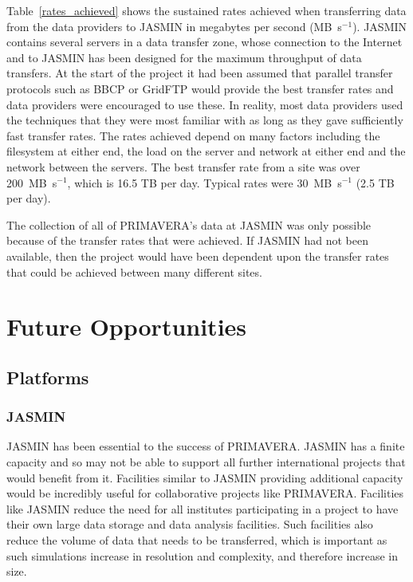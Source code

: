 \documentclass[gmd, manuscript]{copernicus}
\begin{document}
Table~\ref{rates_achieved} shows the sustained rates achieved when transferring data from the data providers to JASMIN in megabytes per second (MB~s$^{-1}$). JASMIN contains several servers in a data transfer zone, whose connection to the Internet and to JASMIN has been designed for the maximum throughput of data transfers. At the start of the project it had been assumed that parallel transfer protocols such as BBCP or GridFTP would provide the best transfer rates and data providers were encouraged to use these. In reality, most data providers used the techniques that they were most familiar with as long as they gave sufficiently fast transfer rates. The rates achieved depend on many factors including the filesystem at either end, the load on the server and network at either end and the network between the servers. The best transfer rate from a site was over 200~MB~s$^{-1}$, which is 16.5 TB per day. Typical rates were 30~MB~s$^{-1}$ (2.5 TB per day).

The collection of all of PRIMAVERA's data at JASMIN was only possible because of the transfer rates that were achieved. If JASMIN had not been available, then the project would have been dependent upon the transfer rates that could be achieved between many different sites.


\section{Future Opportunities}

\subsection{Platforms}

\subsubsection{JASMIN}
JASMIN has been essential to the success of PRIMAVERA. JASMIN has a finite capacity and so may not be able to support all further international projects that would benefit from it. Facilities similar to JASMIN providing additional capacity would be incredibly useful for collaborative projects like PRIMAVERA. Facilities like JASMIN reduce the need for all institutes participating in a project to have their own large data storage and data analysis facilities. Such facilities also reduce the volume of data that needs to be transferred, which is important as such simulations increase in resolution and complexity, and therefore increase in size.
\end{document}
